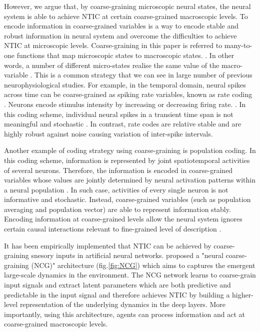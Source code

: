 \documentclass[utf8]{article}
\newcommand{\needref}[1]{%
			\ifthenelse{\equal{#1}{}}{%
				\todo[color=White, linecolor=Orange, bordercolor=Orange]{\textcolor{Orange}{Ref}}}{%
				\todo[color=White, linecolor=Orange, bordercolor=Orange]{\textcolor{Orange}{Ref: #1}}%
			}%
		}
\begin{document}
		However, we argue that, by coarse-graining microscopic neural states, the neural system is able to achieve NTIC at certain coarse-grained macroscopic levels. To encode information in coarse-grained variables is a way to encode stable and robust information in neural system and overcome the difficulties to achieve NTIC at microscopic levels. Coarse-graining in this paper is referred to many-to-one functions that map microscopic states to macroscopic states.\needref{Do we need reference?}. In other words, a number of different micro-states realise the same value of the macro-variable \citep{price2007causation}. This is a common strategy that we can see in large number of previous neurophysiological studies. For example, in the temporal domain, neural spikes across time can be coarse-grained as spiking rate variables, known as rate coding \citep{adrian1926impulses, gerstner2002spiking, maass2001pulsed, panzeri2015neural, stein2005neuronal}. Neurons encode stimulus intensity by increasing or decreasing firing rate. \citep{kandel2000principles}. In this coding scheme, individual neural spikes in a transient time span is not meaningful and stochastic \citep{stein2005neuronal}. In contrast, rate codes are relative stable and are highly robust against noise causing variation of inter-spike intervals. 
		
		Another example of coding strategy using coarse-graining is population coding. In this coding scheme, information is represented by joint spatiotemporal activities of several neurons. Therefore, the information is encoded in coarse-grained variables whose values are jointly determined by neural activation patterns within a neural population \citep{kristan1997population, pouget2000information, binder2009encyclopedia, QuianQuiroga2009}. In such case, activities of every single neuron is not informative and stochastic. Instead, coarse-grained variables (such as population averaging and population vector) are able to represent information stably. Encoding information at coarse-grained levels allow the neural system ignores certain causal interactions relevant to fine-grained level of description \citep{Woodward2007-WOOCWA}.
			
			
		It has been empirically implemented that NTIC can be achieved by coarse-graining snesory inputs in artificial neural networks. \citep{guttenberg2016neural} proposed a "neural coarse-graining (NCG)" architecture (fig.\ref{fig:NCG}) which aims to captures the emergent large-scale dynamics in the environment. The NCG network learns to coarse-grain input signals and extract latent parameters which are both predictive and predictable in the input signal and therefore achieves NTIC by building a higher-level representation of the underlying dynamics in the deep layers. More importantly, using this architecture, agents can process information and act at coarse-grained macroscopic levels.
		
\end{document}

